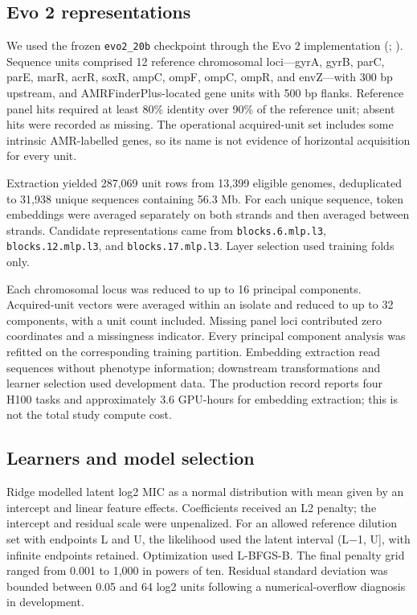\documentclass[
  american,
  11pt,
]{article}
\begin{document}
\subsection{Evo 2 representations}\label{evo-2-representations}

We used the frozen \texttt{evo2\_20b} checkpoint through the Evo 2
implementation (;
). Sequence units
comprised 12 reference chromosomal loci---gyrA, gyrB, parC, parE, marR,
acrR, soxR, ampC, ompF, ompC, ompR, and envZ---with 300 bp upstream, and
AMRFinderPlus-located gene units with 500 bp flanks. Reference panel
hits required at least 80\% identity over 90\% of the reference unit;
absent hits were recorded as missing. The operational acquired-unit set
includes some intrinsic AMR-labelled genes, so its name is not evidence
of horizontal acquisition for every unit.

Extraction yielded 287,069 unit rows from 13,399 eligible genomes,
deduplicated to 31,938 unique sequences containing 56.3 Mb. For each
unique sequence, token embeddings were averaged separately on both
strands and then averaged between strands. Candidate representations
came from \texttt{blocks.6.mlp.l3}, \texttt{blocks.12.mlp.l3}, and
\texttt{blocks.17.mlp.l3}. Layer selection used training folds only.

Each chromosomal locus was reduced to up to 16 principal components.
Acquired-unit vectors were averaged within an isolate and reduced to up
to 32 components, with a unit count included. Missing panel loci
contributed zero coordinates and a missingness indicator. Every
principal component analysis was refitted on the corresponding training
partition. Embedding extraction read sequences without phenotype
information; downstream transformations and learner selection used
development data. The production record reports four H100 tasks and
approximately 3.6 GPU-hours for embedding extraction; this is not the
total study compute cost.

\subsection{Learners and model
selection}\label{learners-and-model-selection}

Ridge modelled latent log2 MIC as a normal distribution with mean given
by an intercept and linear feature effects. Coefficients received an L2
penalty; the intercept and residual scale were unpenalized. For an
allowed reference dilution set with endpoints L and U, the likelihood
used the latent interval (L\ensuremath{-}1, U{]}, with infinite endpoints retained.
Optimization used L-BFGS-B. The final penalty grid ranged from 0.001 to
1,000 in powers of ten. Residual standard deviation was bounded between
0.05 and 64 log2 units following a numerical-overflow diagnosis in
development.
\end{document}
